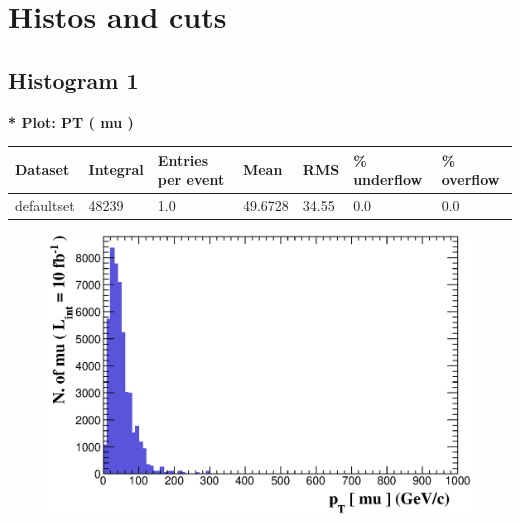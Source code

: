 \documentclass[a4paper, 10pt]{article}
\begin{document}
\newpage
\section{ Histos and cuts}

\subsection{ Histogram 1}

\textbf{* Plot: PT ( mu ) }\\
   \begin{table}[H]
  \begin{center}
    \begin{tabular}{|m{23.0mm}|m{23.0mm}|m{18.0mm}|m{19.0mm}|m{19.0mm}|m{19.0mm}|m{19.0mm}|}
      \hline
      {\cellcolor{yellow}         Dataset}& {\cellcolor{yellow}         Integral}& {\cellcolor{yellow}         Entries per event}& {\cellcolor{yellow}         Mean}& {\cellcolor{yellow}         RMS}& {\cellcolor{yellow}         \% underflow}& {\cellcolor{yellow}         \% overflow}\\
      \hline
      {\cellcolor{white}         defaultset}& {\cellcolor{white}         48239}& {\cellcolor{white}         1.0}& {\cellcolor{white}         49.6728}& {\cellcolor{white}         34.55}& {\cellcolor{green}         0.0}& {\cellcolor{green}         0.0}\\
\hline
    \end{tabular}
  \end{center}
\end{table}

\begin{figure}[H]
  \begin{center}
    \includegraphics[scale=0.45]{selection_0.eps}\\
\caption{   }
  \end{center}
\end{figure}
      \newpage
\end{document}
